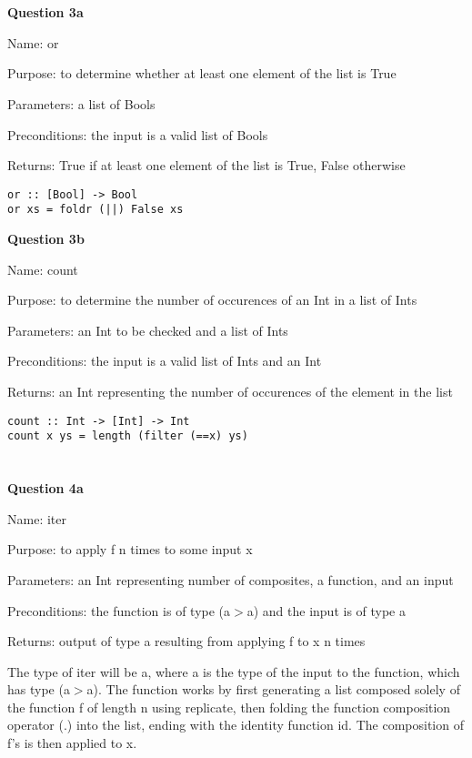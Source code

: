 \documentclass{article}
\begin{document}
\section{}

\textbf{Question 3a}

Name: or

Purpose: to determine whether at least one element of the list is True

Parameters: a list of Bools

Preconditions: the input is a valid list of Bools

Returns: True if at least one element of the list is True, False otherwise

\begin{lstlisting}
or :: [Bool] -> Bool
or xs = foldr (||) False xs
\end{lstlisting}

\textbf{Question 3b}

Name: count

Purpose: to determine the number of occurences of an Int in a list of Ints

Parameters: an Int to be checked and a list of Ints

Preconditions: the input is a valid list of Ints and an Int

Returns: an Int representing the number of occurences of the element in the list

\begin{lstlisting}
count :: Int -> [Int] -> Int
count x ys = length (filter (==x) ys)
\end{lstlisting}

\section{}

\textbf{Question 4a}

Name: iter

Purpose: to apply f n times to some input x

Parameters: an Int representing number of composites, a function, and an input

Preconditions: the function is of type (a\textemdash$>$a) and the input is of
type a

Returns: output of type a resulting from applying f to x n times

The type of iter will be a, where a is the type of the input to the function,
which has type (a\textemdash$>$a). The function works by first generating a
list composed solely of the function f of length n using replicate, then folding
the function composition operator (.) into the list, ending with the identity
function id. The composition of f's is then applied to x.
\end{document}

